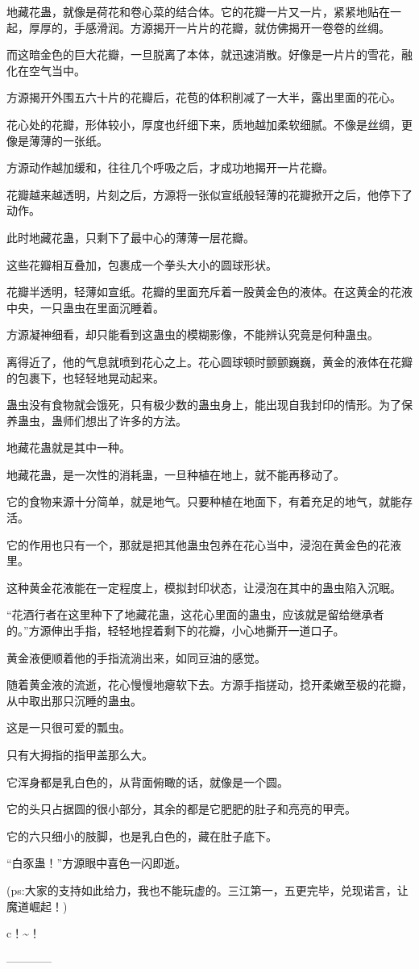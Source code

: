\begin{this_body}
地藏花蛊，就像是荷花和卷心菜的结合体。它的花瓣一片又一片，紧紧地贴在一起，厚厚的，手感滑润。方源揭开一片片的花瓣，就仿佛揭开一卷卷的丝绸。

而这暗金色的巨大花瓣，一旦脱离了本体，就迅速消散。好像是一片片的雪花，融化在空气当中。

方源揭开外围五六十片的花瓣后，花苞的体积削减了一大半，露出里面的花心。

花心处的花瓣，形体较小，厚度也纤细下来，质地越加柔软细腻。不像是丝绸，更像是薄薄的一张纸。

方源动作越加缓和，往往几个呼吸之后，才成功地揭开一片花瓣。

花瓣越来越透明，片刻之后，方源将一张似宣纸般轻薄的花瓣掀开之后，他停下了动作。

此时地藏花蛊，只剩下了最中心的薄薄一层花瓣。

这些花瓣相互叠加，包裹成一个拳头大小的圆球形状。

花瓣半透明，轻薄如宣纸。花瓣的里面充斥着一股黄金色的液体。在这黄金的花液中央，一只蛊虫在里面沉睡着。

方源凝神细看，却只能看到这蛊虫的模糊影像，不能辨认究竟是何种蛊虫。

离得近了，他的气息就喷到花心之上。花心圆球顿时颤颤巍巍，黄金的液体在花瓣的包裹下，也轻轻地晃动起来。

蛊虫没有食物就会饿死，只有极少数的蛊虫身上，能出现自我封印的情形。为了保养蛊虫，蛊师们想出了许多的方法。

地藏花蛊就是其中一种。

地藏花蛊，是一次性的消耗蛊，一旦种植在地上，就不能再移动了。

它的食物来源十分简单，就是地气。只要种植在地面下，有着充足的地气，就能存活。

它的作用也只有一个，那就是把其他蛊虫包养在花心当中，浸泡在黄金色的花液里。

这种黄金花液能在一定程度上，模拟封印状态，让浸泡在其中的蛊虫陷入沉眠。

“花酒行者在这里种下了地藏花蛊，这花心里面的蛊虫，应该就是留给继承者的。”方源伸出手指，轻轻地捏着剩下的花瓣，小心地撕开一道口子。

黄金液便顺着他的手指流淌出来，如同豆油的感觉。

随着黄金液的流逝，花心慢慢地瘪软下去。方源手指搓动，捻开柔嫩至极的花瓣，从中取出那只沉睡的蛊虫。

这是一只很可爱的瓢虫。

只有大拇指的指甲盖那么大。

它浑身都是乳白色的，从背面俯瞰的话，就像是一个圆。

它的头只占据圆的很小部分，其余的都是它肥肥的肚子和亮亮的甲壳。

它的六只细小的肢脚，也是乳白色的，藏在肚子底下。

“白豕蛊！”方源眼中喜色一闪即逝。

(ps:大家的支持如此给力，我也不能玩虚的。三江第一，五更完毕，兑现诺言，让魔道崛起！)

c！\~{}！

------------

\end{this_body}

